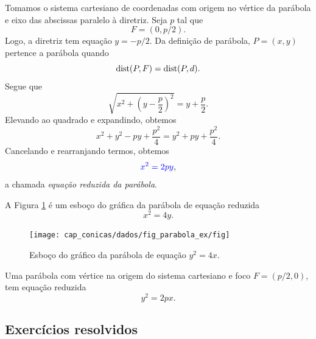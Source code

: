 Tomamos o sistema cartesiano de coordenadas com origem no vértice da parábola e eixo das abscissas paralelo à diretriz. Seja $p$ tal que
\begin{equation}
  F = (0, p/2).
\end{equation}
Logo, a diretriz tem equação $y = -p/2$. Da definição de parábola, $P=(x,y)$ pertence a parábola quando
\begin{equation}
  \operatorname{dist}(P, F) = \operatorname{dist}(P, d).
\end{equation}
Segue que
\begin{equation}
  \sqrt{x^2+\left(y-\frac{p}{2}\right)^2} = y+\frac{p}{2}.
\end{equation}
Elevando ao quadrado e expandindo, obtemos
\begin{equation}
  x^2 + y^2-py+\frac{p^2}{4} = y^2 + py + \frac{p^2}{4}.
\end{equation}
Cancelando e rearranjando termos, obtemos
\begin{equation}
  {\color{blue}x^2 = 2py},
\end{equation}
a chamada \emph{equação reduzida da parábola}.

\begin{ex}
  A Figura \ref{fig:parabola_ex} é um esboço do gráfica da parábola de equação reduzida
  \begin{equation}
    x^2 = 4y.
  \end{equation}

  \begin{figure}[H]
    \centering
    \texttt{[image: cap\_conicas/dados/fig\_parabola\_ex/fig]}
    \caption{Esboço do gráfico da parábola de equação $y^2 = 4x$.}
    \label{fig:parabola_ex}
  \end{figure}
\end{ex}

\begin{obs}
  Uma parábola com vértice na origem do sistema cartesiano e foco $F=(p/2, 0)$, tem equação reduzida
  \begin{equation}
    y^2 = 2px.
  \end{equation}
\end{obs}

\subsection*{Exercícios resolvidos}

